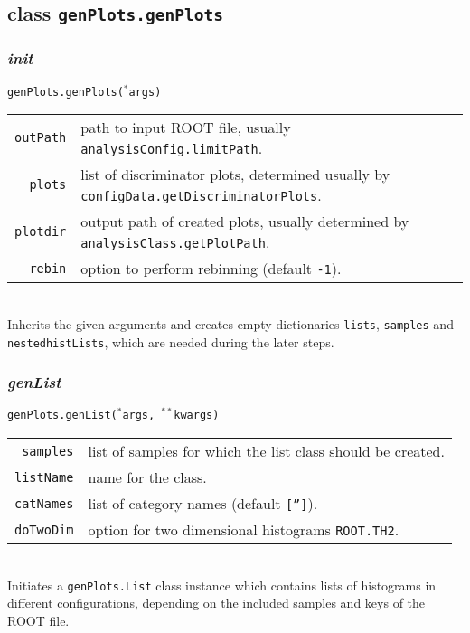 \documentclass[12pt, a4paper]{article}
\newcommand{\args}{$^*$args}
\newcommand{\kwargs}{$^{**}$kwargs}
\begin{document}
\subsection{class \texttt{genPlots.genPlots}}

\subsubsection{\textit{init}}
\texttt{genPlots.genPlots(\args)}\\
\begin{tabular}{r|l}
\hline
\texttt{outPath}	&	path to input ROOT file, usually \texttt{analysisConfig.limitPath}.\\
\texttt{plots}		&	list of discriminator plots, determined usually by \texttt{configData.getDiscriminatorPlots}.\\
\texttt{plotdir}	&	output path of created plots, usually determined by \texttt{analysisClass.getPlotPath}.\\
\texttt{rebin}		&	option to perform rebinning (default \texttt{-1}).\\
\hline
\end{tabular}
\\
Inherits the given arguments and creates empty dictionaries \texttt{lists}, \texttt{samples} and \texttt{nestedhistLists}, which are needed during the later steps.

\subsubsection{\textit{genList}}
\texttt{genPlots.genList(\args, \kwargs)}\\
\begin{tabular}{r|l}
\hline
\texttt{samples}	&	list of samples for which the list class should be created.\\
\texttt{listName}	&	name for the class.\\
\texttt{catNames}	&	list of category names (default \texttt{['']}).\\
\texttt{doTwoDim}	&	option for two dimensional histograms \texttt{ROOT.TH2}.\\
\hline
\end{tabular}
\\
Initiates a \texttt{genPlots.List} class instance which contains lists of histograms in different configurations, depending on the included samples and keys of the ROOT file.
\end{document}
